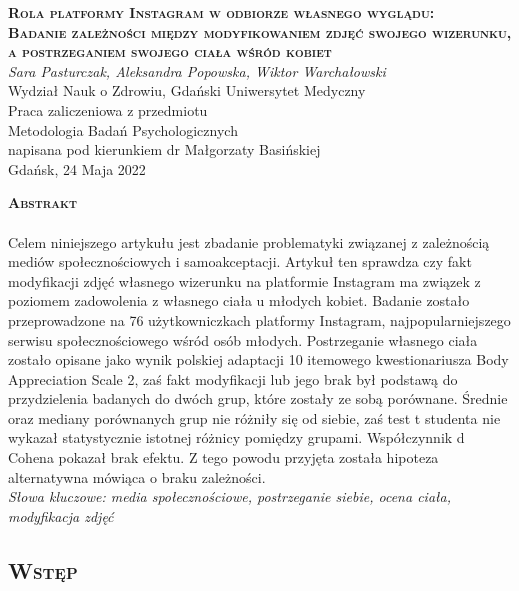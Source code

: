 \documentclass[12pt,a4paper,final,oneside,onecolumn,titlepage]{article}
\begin{document}
\pagestyle{fancy}
\fancyhead{}
\fancyfoot{}
\rhead{\thepage}

\begin{titlepage}
  \thispagestyle{empty}
  \rhead{\thepage}
  \begin{center}
  \vspace*{1cm}
  \Large
  \textbf{\textsc{Rola platformy Instagram w odbiorze własnego wyglądu:\\ Badanie zależności między modyfikowaniem zdjęć swojego wizerunku, a postrzeganiem swojego ciała wśród kobiet\\}}
  \vspace{1.5cm}
  \textit{Sara Pasturczak, Aleksandra Popowska, Wiktor Warchałowski\\}
  Wydział Nauk o Zdrowiu, Gdański Uniwersytet Medyczny\\
  \vspace{3cm}
  Praca zaliczeniowa z przedmiotu \\ Metodologia Badań Psychologicznych \\ napisana pod kierunkiem dr Małgorzaty Basińskiej\\
  \vspace{3cm}
  Gdańsk, 24 Maja 2022
  \end{center}
\end{titlepage}
\begin{center}
  \vspace*{0.5cm}
  \large{\textbf{\textsc{Abstrakt}}}
\end{center}
\paragraph{}
Celem niniejszego artykułu jest zbadanie problematyki związanej z zależnością mediów społecznościowych i samoakceptacji. Artykuł ten sprawdza czy fakt modyfikacji zdjęć własnego wizerunku na platformie Instagram ma związek z poziomem zadowolenia z własnego ciała u młodych kobiet. Badanie zostało przeprowadzone na 76 użytkowniczkach platformy Instagram, najpopularniejszego serwisu społecznościowego wśród osób młodych. Postrzeganie własnego ciała zostało opisane jako wynik polskiej adaptacji 10 itemowego kwestionariusza Body Appreciation Scale 2, zaś fakt modyfikacji lub jego brak był podstawą do przydzielenia badanych do dwóch grup, które zostały ze sobą porównane. Średnie oraz mediany porównanych grup nie różniły się od siebie, zaś test t studenta nie wykazał statystycznie istotnej różnicy pomiędzy grupami. Współczynnik d Cohena pokazał brak efektu. Z tego powodu przyjęta została hipoteza alternatywna mówiąca o braku zależności.\\
\textit{Słowa kluczowe: media społecznościowe, postrzeganie siebie, ocena ciała, modyfikacja zdjęć}
\newpage
\begin{center}
\section*{\large{\textbf{\textsc{Wstęp}}}}
\end{center}
\end{document}
